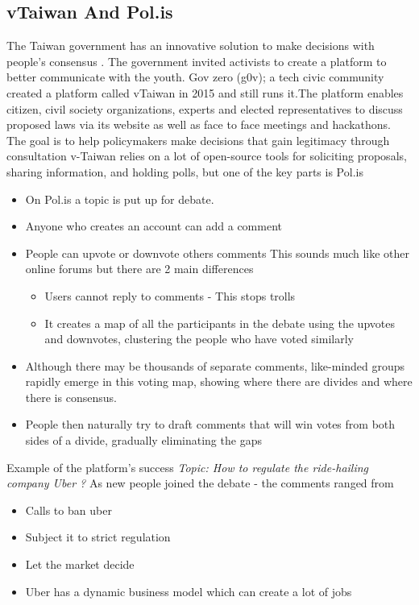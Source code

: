 \documentclass[11pt, conference, a4paper]{IEEEtran}
\begin{document}
\subsection{vTaiwan And Pol.is}
The Taiwan government has an innovative solution to make decisions with people’s consensus \cite{polis}. The government invited activists to create a platform to better communicate with the youth. Gov zero (g0v); a tech civic community created a platform called vTaiwan in 2015 and still runs it.The platform enables citizen, civil society organizations, experts and elected representatives to discuss proposed laws via its website as well as face to face meetings and hackathons. The goal is to help policymakers make decisions that gain legitimacy through consultation
v-Taiwan relies on a lot of open-source tools for soliciting proposals, sharing information, and holding polls, but one of the key parts is Pol.is
\begin{itemize}
\item On Pol.is a topic is put up for debate.
\item Anyone who creates an account can add a comment
\item People can upvote or downvote others comments
This sounds much like other online forums but there are 2 main differences
  \begin{itemize}
    \item Users cannot reply to comments - This stops trolls
    \item It creates a map of all the participants in the debate using the upvotes and downvotes, clustering the people who have voted similarly
  \end{itemize}
\item Although there may be thousands of separate comments, like-minded groups rapidly emerge in this voting map, showing where there are divides and where there is consensus.
\item People then naturally try to draft comments that will win votes from both sides of a divide, gradually eliminating the gaps
\end{itemize}
Example of the platform's success
\textit{Topic: How to regulate the ride-hailing company Uber ?}
As new people joined the debate - the comments ranged from
\begin{itemize}
\item Calls to ban uber
\item Subject it to strict regulation
\item Let the market decide
\item Uber has a dynamic business model which can create a lot of jobs
\end{itemize}
\end{document}
